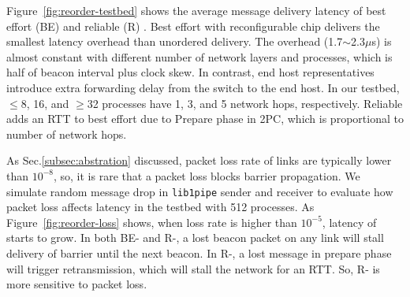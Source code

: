 Figure~\ref{fig:reorder-testbed} shows the average message delivery latency of best effort (BE) and reliable (R) \sys{}.
Best effort \sys{} with reconfigurable chip delivers the smallest latency overhead than unordered delivery. The overhead (1.7$\sim$2.3$\mu$s) is almost constant with different number of network layers and processes, which is half of beacon interval plus clock skew. In contrast, end host representatives introduce extra forwarding delay from the switch to the end host. In our testbed, $\le$8, 16, and $\ge$32 processes have 1, 3, and 5 network hops, respectively.
Reliable \sys{} adds an RTT to best effort \sys{} due to Prepare phase in 2PC, which is proportional to number of network hops.

As Sec.\ref{subsec:abstration} discussed, packet loss rate of links are typically lower than $10^{-8}$, so, it is rare that a packet loss blocks barrier propagation.
We simulate random message drop in \texttt{lib1pipe} sender and receiver to evaluate how packet loss affects latency in the testbed with 512 processes.
As Figure~\ref{fig:reorder-loss} shows, when loss rate is higher than $10^{-5}$, latency of \sys{} starts to grow. In both BE- and R-\sys{}, a lost beacon packet on any link will stall delivery of barrier until the next beacon. In R-\sys{}, a lost message in prepare phase will trigger retransmission, which will stall the network for an RTT. So, R-\sys{} is more sensitive to packet loss.






